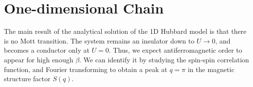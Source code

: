\section{One-dimensional Chain}
\label{sec:1d-chain}

The main result of the analytical solution of the \acs{1D} Hubbard model is that there is no Mott transition.
The system remains an insulator down to $U \rightarrow 0$, and becomes a conductor only at $U = 0$.
Thus, we expect antiferromagnetic order to appear for high enough $\beta$.
We can identify it by studying the spin-spin correlation function, and Fourier transforming to obtain a peak at $q = \pi$ in the magnetic structure factor $S ( q ) $.